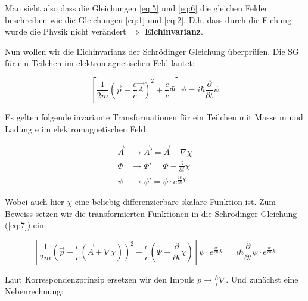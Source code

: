Man sieht also dass die Gleichungen \eqref{eq:5} und \eqref{eq:6} die gleichen Felder beschreiben wie die Gleichungen \eqref{eq:1} und \eqref{eq:2}. D.h. dass durch die Eichung wurde die Physik nicht verändert \(\Rightarrow \) \textbf{Eichinvarianz}.


Nun wollen wir die Eichinvarianz der Schrödinger Gleichung überprüfen. Die SG für ein Teilchen im elektromagnetischen Feld lautet:

\begin{equation}
\label{eq:7}
  \left[\frac{1}{2m} (\vec p - \frac{e}{c}\vec A)^2  +\frac{e}{c}\Phi \right]\psi =  i\hbar \frac{\partial}{\partial t}\psi 
\end{equation}

Es gelten folgende invariante Transformationen für ein Teilchen mit Masse m und Ladung e im elektromagnetischen Feld:

\begin{align}
  \vec A &\rightarrow \vec A' = \vec A+\nabla\chi  \label{eq:8}\\
 \Phi &\rightarrow \Phi' = \Phi - \frac{\partial}{\partial t} \chi \label{eq:9}\\
 \psi &\rightarrow \psi' = \psi\cdot e^{\frac{ie}{c\hbar}\chi}\label{eq:10}
\end{align}

Wobei auch hier \(\chi\) eine beliebig differenzierbare skalare Funktion ist. Zum Beweiss setzen wir die transformierten Funktionen in die Schrödinger Gleichung (\ref{eq:7}) ein:

\begin{equation}
  \left[\frac{1}{2m} \left(\vec p - \frac{e}{c}(\vec A +\nabla\chi) \right)^2  +\frac{e}{c}(\Phi-  \frac{\partial}{\partial t} \chi) \right]\psi\cdot e^{\frac{ie}{c\hbar}\chi}\  =  i\hbar \frac{\partial}{\partial t}\psi \cdot e^{\frac{ie}{c\hbar}\chi} \label{eq:10.5}  
\end{equation}

Laut Korrespondenzprinzip ersetzen wir den Impuls \(p \rightarrow \frac{\hbar}{i}\nabla\). Und zunächst eine Nebenrechnung:

